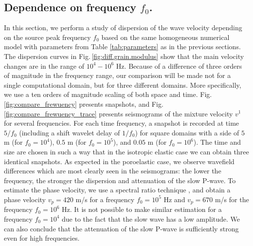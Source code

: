 \documentclass[3p,times,table]{article}
\begin{document}
\subsection{Dependence on frequency $f_{0}$.}\label{sec.frequency}

In this section, we perform a study of dispersion of the wave velocity depending on the 
source 
peak frequency $f_{0}$  based on the same homogeneous numerical model 
with 
parameters from Table \ref{tab:parameters} as in the previous sections. 
The dispersion curves in Fig.\,\ref{fig:diff.grain.modulus} show that the main 
velocity changes are in the range of $10^{4}-10^{6}$ Hz. Because of a difference of 
three orders of magnitude in the frequency range, our comparison will be made 
not 
for a single computational domain, but for three different 
domains. More specifically, we use a ten orders of magnitude scaling of  both space and 
time. Fig.\,\ref{fig:compare_frewuency} presents 
snapshots, and Fig.\,\ref{fig:compare_frewuency_trace} presents seismograms of 
the mixture velocity $v^1$ for several frequencies. For each time frequency, 
a snapshot is recorded at time $5/{f_{0}}$ (including a shift wavelet 
delay of $1/{f_{0}}$) for square domains with a side of $ 5 $ m (for 
$f_{0}=10^{4}$), $0.5$  m (for 
$f_{0}=10^{5}$), and $0.05$  m (for $f_{0}=10^{6}$). The time 
and size are chosen in such a way that in the isotropic elastic case 
we can obtain three identical snapshots. As expected in the poroelastic 
case, 
we 
observe wavefield differences which are most clearly seen in the seismograms: the 
lower the frequency, the stronger the dispersion and attenuation of the slow 
P-wave. 
To estimate the phase velocity, we use 
a spectral ratio technique 
\cite{Gurevich2015}, \cite{Caspari2019}
and obtain a 
phase velocity $v_{p}=420 $ m/s for a frequency $f_{0}=10^{5}$ Hz and
$v_{p}=670 $ m/s  for the frequency $f_{0}=10^{6}$ Hz. 
It is not possible to make 
similar estimation for a frequency $f_{0}=10^{4}$ due to the fact that the slow wave has a low amplitude. We 
can also conclude that the attenuation of the slow P-wave is sufficiently strong even 
for high frequencies.
\end{document}
